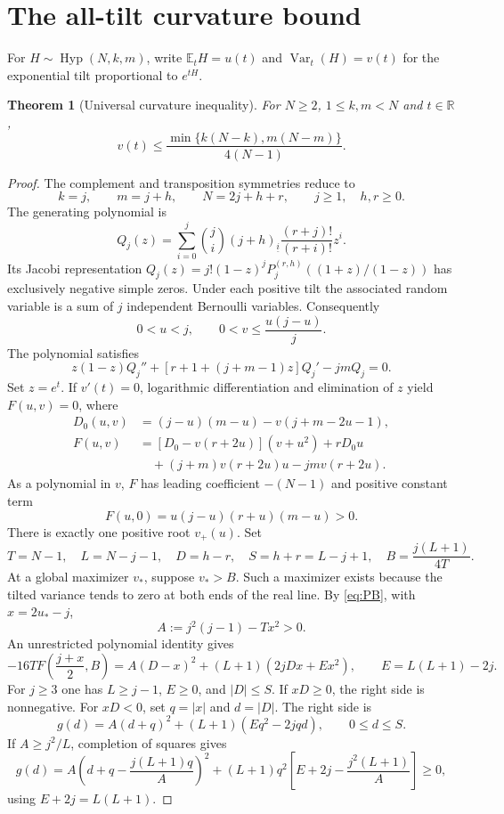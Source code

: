 \documentclass[11pt,a4paper]{article}
\DeclareMathOperator{\Var}{Var}\DeclareMathOperator{\Hyp}{Hyp}\DeclareMathOperator{\Bern}{Bern}
\newcommand{\E}{\mathbb E}\newcommand{\R}{\mathbb R}
\newtheorem{theorem}{Theorem}[section]\newtheorem{lemma}[theorem]{Lemma}
\begin{document}
\section{The all-tilt curvature bound}
For $H\sim\Hyp(N,k,m)$, write $\E_tH=u(t)$ and $\Var_t(H)=v(t)$ for the exponential tilt proportional to $e^{tH}$.
\begin{theorem}[Universal curvature inequality]\label{thm:curv}
For $N\ge2$, $1\le k,m<N$ and $t\in\R$,
\begin{equation}\label{eq:curv}
 v(t)\le \frac{\min\{k(N-k),m(N-m)\}}{4(N-1)}.
\end{equation}
\end{theorem}
\begin{proof}
The complement and transposition symmetries reduce to
\[
 k=j,\qquad m=j+h,\qquad N=2j+h+r,\qquad j\ge1,\quad h,r\ge0.
\]
The generating polynomial is
\[
 Q_j(z)=\sum_{i=0}^j\binom ji(j+h)_{\underline i}\frac{(r+j)!}{(r+i)!}z^i.
\]
Its Jacobi representation
$Q_j(z)=j!(1-z)^jP_j^{(r,h)}((1+z)/(1-z))$ has exclusively negative simple zeros. Under each positive tilt the associated random variable is a sum of $j$ independent Bernoulli variables. Consequently
\begin{equation}\label{eq:PB}
0<u<j,\qquad 0<v\le\frac{u(j-u)}j.
\end{equation}
The polynomial satisfies
\[
 z(1-z)Q_j''+[r+1+(j+m-1)z]Q_j'-jmQ_j=0.
\]
Set $z=e^t$. If $v'(t)=0$, logarithmic differentiation and elimination of $z$ yield $F(u,v)=0$, where
\begin{align*}
 D_0(u,v)&=(j-u)(m-u)-v(j+m-2u-1),\\
 F(u,v)&=[D_0-v(r+2u)](v+u^2)+rD_0u\\
 &\quad +(j+m)v(r+2u)u-jmv(r+2u).
\end{align*}
As a polynomial in $v$, $F$ has leading coefficient $-(N-1)$ and positive constant term
\[
 F(u,0)=u(j-u)(r+u)(m-u)>0.
\]
There is exactly one positive root $v_+(u)$. Set
\[
 T=N-1,\quad L=N-j-1,\quad D=h-r,\quad S=h+r=L-j+1,\quad B=\frac{j(L+1)}{4T}.
\]
At a global maximizer $v_*$, suppose $v_*>B$. Such a maximizer exists because the tilted variance tends to zero at both ends of the real line. By \eqref{eq:PB}, with $x=2u_*-j$,
\[
 A:=j^2(j-1)-Tx^2>0.
\]
An unrestricted polynomial identity gives
\begin{equation}\label{eq:stationary}
-16TF\left(\frac{j+x}2,B\right)=A(D-x)^2+(L+1)(2jDx+Ex^2),\qquad E=L(L+1)-2j.
\end{equation}
For $j\ge3$ one has $L\ge j-1$, $E\ge0$, and $|D|\le S$. If $xD\ge0$, the right side is nonnegative. For $xD<0$, set $q=|x|$ and $d=|D|$. The right side is
\[
 g(d)=A(d+q)^2+(L+1)(Eq^2-2jqd),\qquad 0\le d\le S.
\]
If $A\ge j^2/L$, completion of squares gives
\[
 g(d)=A\left(d+q-\frac{j(L+1)q}{A}\right)^2
 +(L+1)q^2\left[E+2j-\frac{j^2(L+1)}A\right]\ge0,
\]
using $E+2j=L(L+1)$.


\end{proof}
\end{document}
